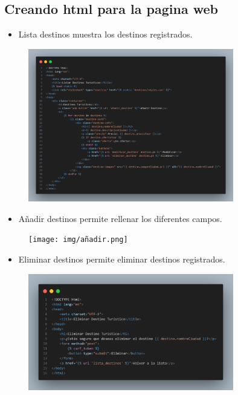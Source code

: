 \documentclass{article}
\begin{document}
	\subsection{Creando html para la pagina web}
    \begin{itemize}
		\item Lista destinos muestra los destinos registrados.
	\end{itemize}
	\begin{figure}[H]
		\centering
		\includegraphics[width=0.8\textwidth,keepaspectratio]{img/lista.png}
	\end{figure}
	\begin{itemize}
		\item Añadir destinos permite rellenar los diferentes campos.
	\end{itemize}
	\begin{figure}[H]
		\centering
		\texttt{[image: img/añadir.png]}
	\end{figure}
	\begin{itemize}
		\item Eliminar destinos permite eliminar destinos registrados.
	\end{itemize}
	\begin{figure}[H]
		\centering
		\includegraphics[width=0.8\textwidth,keepaspectratio]{img/eliminar.png}
	\end{figure}
\end{document}
